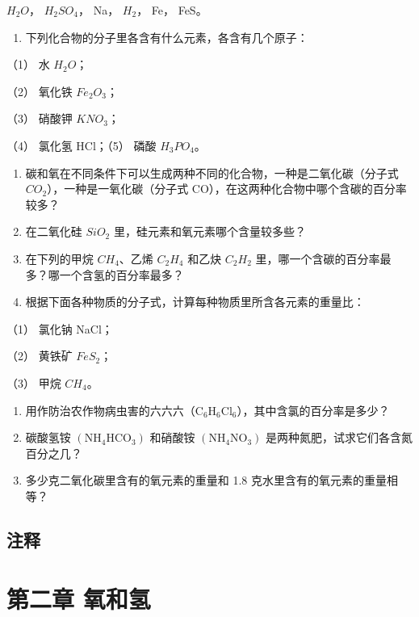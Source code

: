 \(H_{2}O\)， \(H_{2}SO_{4}\)， Na， \(H_{2}\)， Fe， FeS。

\begin{enumerate}[start=5]
\item
  下列化合物的分子里各含有什么元素，各含有几个原子：
\end{enumerate}

（1） 水 \(H_{2}O\)；

（2） 氧化铁 \(Fe_{2}O_{3}\)；

（3） 硝酸钾 \(KNO_{3}\)；

（4） 氯化氢 HCl；（5） 磷酸 \(H_{3}PO_{4}\)。

\begin{enumerate}[start=6]
\item
  碳和氧在不同条件下可以生成两种不同的化合物，一种是二氧化碳（分子式
  \(CO_{2}\)），一种是一氧化碳（分子式
  CO），在这两种化合物中哪个含碳的百分率较多？
\item
  在二氧化硅 \(SiO_{2}\) 里，硅元素和氧元素哪个含量较多些？
\item
  在下列的甲烷 \(CH_{4}\)、乙烯 \(C_{2}H_{4}\) 和乙炔 \(C_{2}H_{2}\)
  里，哪一个含碳的百分率最多？哪一个含氢的百分率最多？
\item
  根据下面各种物质的分子式，计算每种物质里所含各元素的重量比：
\end{enumerate}

（1） 氯化钠 NaCl；

（2） 黄铁矿 \(FeS_{2}\)；

（3） 甲烷 \(CH_{4}\)。

\begin{enumerate}[start=10]
\item
  用作防治农作物病虫害的六六六（\(\mathrm{C_6H_6Cl_6}\)），其中含氯的百分率是多少？
\item
  碳酸氢铵 \(\left(\mathrm{NH}_{4}\mathrm{HCO}_{3}\right)\) 和硝酸铵
  \(\left(\mathrm{NH}_{4}\mathrm{NO}_{3}\right)\)
  是两种氮肥，试求它们各含氮百分之几？
\item
  多少克二氧化碳里含有的氧元素的重量和 1.8
  克水里含有的氧元素的重量相等？
\end{enumerate}

\section{注释}

\chapter{第二章 氧和氢}

